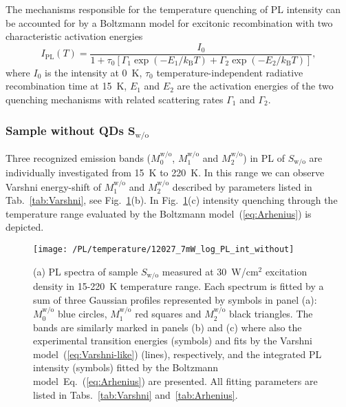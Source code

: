 The mechanisms responsible for the temperature quenching of PL intensity can be accounted for by a Boltzmann model for excitonic recombination with two characteristic activation energies~\citep{Daly_prb1995, Alen_apl2011}
\begin{equation}
I_\mathrm{PL}(T)=\frac{I_0}{1+\tau_0\left[\Gamma_1\exp(-E_1/k_\mathrm{B}T)+\Gamma_2\exp(-E_2/k_\mathrm{B}T)\right]},               \label{eq:Arhenius}
\end{equation}
where $I_0$ is the intensity at 0~K, $\tau_0$ temperature-independent radiative recombination time at 15~K, $E_1$ and $E_2$ are the activation energies of the two quenching mechanisms with related scattering rates $\Gamma_1$ and $\Gamma_2$.%
\newpage
\subsubsection*{Sample without QDs $\mathbf{S_\mathrm{w/o}}$}
%
Three recognized emission bands ($M_0^\mathrm{w/o}$, $M_1^\mathrm{w/o}$ and $M_2^\mathrm{w/o}$) in PL of ${S_\mathrm{w/o}}$ are individually investigated from 15~K to 220~K. In this range we can observe Varshni energy-shift of $M_1^\mathrm{w/o}$ and $M_2^\mathrm{w/o}$ described by parameters listed in Tab.~\ref{tab:Varshni}, see Fig.~\ref{fig:QD_wo_temp}(b). In Fig.~\ref{fig:QD_wo_temp}(c) intensity quenching through the temperature range evaluated by the Boltzmann model~(\ref{eq:Arhenius}) is depicted.
%
\begin{figure}
	\centering
	\texttt{[image: /PL/temperature/12027\_7mW\_log\_PL\_int\_without]}
	\caption{(a) PL spectra of sample $S_\mathrm{w/o}$ measured at 30~W/cm$^2$ excitation density in 15-220~K temperature range. Each spectrum is fitted by a sum of three Gaussian profiles represented by symbols in panel (a): $M_0^\mathrm{w/o}$ blue circles, $M_1^\mathrm{w/o}$ red squares and $M_2^\mathrm{w/o}$ black triangles. The bands are similarly marked in panels (b) and (c) where also the experimental transition energies (symbols) and fits by the Varshni model~(\ref{eq:Varshni-like}) (lines), respectively, and the integrated PL intensity (symbols) fitted by the Boltzmann model~Eq.~(\ref{eq:Arhenius}) are presented. All fitting parameters are listed in Tabs.~\ref{tab:Varshni} and~\ref{tab:Arhenius}.}
	\label{fig:QD_wo_temp}
\end{figure}


